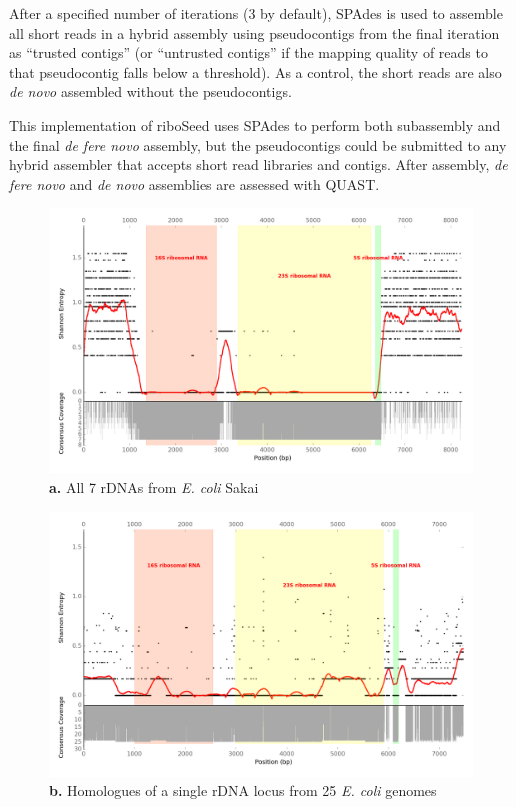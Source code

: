 \documentclass[a4,center,fleqn]{NAR}
\begin{document}
After a specified number of iterations (3 by default), SPAdes is used to assemble all short reads in a hybrid assembly using pseudocontigs from the final iteration as ``trusted contigs'' (or ``untrusted contigs'' if the mapping quality of reads to that pseudocontig falls below a threshold). As a control, the short reads are also \textit{de novo} assembled without the pseudocontigs.


This implementation of riboSeed uses SPAdes to perform both subassembly and the final \textit{de fere novo} assembly, but the pseudocontigs could be submitted to any hybrid assembler that accepts short read libraries and contigs. After assembly, \textit{de fere novo} and \textit{de novo} assemblies are assessed with QUAST\cite{Gurevich2013}.

\begin{figure}[!t]
  \centering
  \begin{minipage}{.5\textwidth}
  \centering
      \includegraphics[width=\columnwidth]{entropy_plot}
      {\footnotesize \textbf{a.} All 7 rDNAs from \textit{E. coli} Sakai}
  \end{minipage}%
  \begin{minipage}{.5\textwidth}
  \centering
      \includegraphics[width=\columnwidth]{entropy_plot_gmbH}
      {\footnotesize\textbf{b.} Homologues of a single rDNA locus from 25 \textit{E. coli} genomes}


\end{minipage}
\end{figure}
\end{document}
